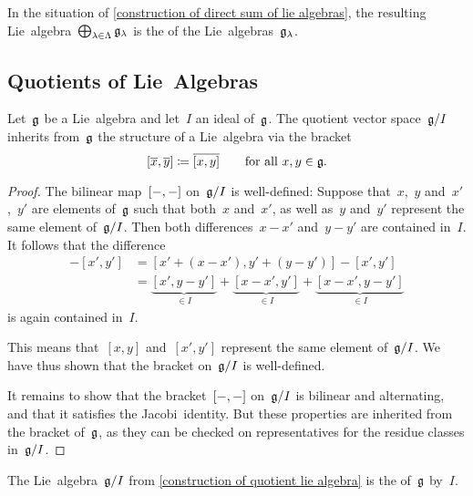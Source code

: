 \begin{definition}
	In the situation of \cref{construction of direct sum of lie algebras}, the resulting Lie~algebra~$\bigoplus_{\lambda \in \Lambda} \mathfrak{g}_\lambda$ is the  of the Lie~algebras~$\mathfrak{g}_\lambda$.
\end{definition}


\subsection{Quotients of Lie~Algebras}


\begin{proposition}
	\label{construction of quotient lie algebra}
	Let~$\mathfrak{g}$ be a Lie~algebra and let~$I$ an ideal of~$\mathfrak{g}$.
	The quotient vector space~$\mathfrak{g}/I$ inherits from~$\mathfrak{g}$ the structure of a Lie~algebra via the bracket
	\[
		[\overline{x}, \overline{y}]
		\coloneqq
		\overline{ [x,y] }
		\qquad
		\text{for all~$x, y \in \mathfrak{g}$.}
	\]
\end{proposition}


\begin{proof}
	The bilinear map~$[-, -]$ on~$\mathfrak{g}/I$ is well-defined:
	Suppose that~$x$,~$y$ and~$x'$,~$y'$ are elements of~$\mathfrak{g}$ such that both~$x$ and~$x'$, as well as~$y$ and~$y'$ represent the same element of~$\mathfrak{g} / I$.
	Then both differences~$x - x'$ and~$y - y'$ are contained in~$I$.
	It follows that the difference
	\begin{align*}
		[x,y] - [x', y']
		&=
		[x' + (x-x'), y' + (y-y')] - [x', y']
		\\
		&=
			\underbrace{[x', y-y']}_{\in I}
		+ \underbrace{[x-x', y']}_{\in I}
		+ \underbrace{[x-x', y-y']}_{\in I}
	\end{align*}
	is again contained in~$I$.

	This means that~$[x, y]$ and~$[x', y']$ represent the same element of~$\mathfrak{g} / I$.
	We have thus shown that the bracket on~$\mathfrak{g}/I$ is well-defined.
	
	It remains to show that the bracket~$[-, -]$ on~$\mathfrak{g} / I$ is bilinear and alternating, and that it satisfies the Jacobi~identity.
	But these properties are inherited from the bracket of~$\mathfrak{g}$, as they can be checked on representatives for the residue classes in~$\mathfrak{g} / I$.
\end{proof}


\begin{definition}
	\label{definition of quotient representation}
	The Lie~algebra~$\mathfrak{g} / I$ from \cref{construction of quotient lie algebra} is the  of~$\mathfrak{g}$ by~$I$.
\end{definition}


